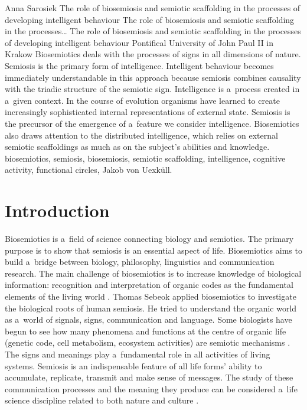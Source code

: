 \begin{artengenv}{Anna Sarosiek}
	{The role of biosemiosis and semiotic scaffolding in the processes of developing intelligent behaviour}
	{The role of biosemiosis and semiotic scaffolding in the processes\ldots}
	{The role of biosemiosis and semiotic scaffolding in the processes\\
	of developing intelligent behaviour}
	{Pontifical University of John Paul II in Krakow\label{sarosiek_anfang}}
	{Biosemiotics deals with the processes of signs in all dimensions of nature. Semiosis is the primary form of intelligence. Intelligent behaviour becomes immediately understandable in this approach because semiosis combines causality with the triadic structure of the semiotic sign. Intelligence is a~process created in a~given context. In the course of evolution organisms have learned to create increasingly sophisticated internal representations of external state. Semiosis is the precursor of the emergence of a~feature we consider intelligence. Biosemiotics also draws attention to the distributed intelligence, which relies on external semiotic scaffoldings as much as on the subject’s abilities and knowledge.}
	{biosemiotics, semiosis, biosemiosis, semiotic scaffolding, intelligence, cognitive activity, functional circles, Jakob von Uexküll.}





\section*{Introduction }
\lettrine[loversize=0.13,lines=2,lraise=-0.03,nindent=0em,findent=0.2pt]%
{B}{}iosemiotics is a~field of science connecting biology and semiotics. The primary purpose is to show that semiosis is an essential aspect of life. Biosemiotics aims to build a~bridge between biology, philosophy, linguistics and communication research. The main challenge of biosemiotics is to increase knowledge of biological information: recognition and interpretation of organic codes as the fundamental elements of the living world
\parencite[][]{barbieri_life_2005}. %
 Thomas Sebeok applied biosemiotics to investigate the biological roots of human semiosis. He tried to understand the organic world as a~world of signals, signs, communication and language. Some biologists have begun to see how many phenomena and functions at the centre of organic life (genetic code, cell metabolism, ecosystem activities) are semiotic mechanisms 
\parencite[][]{anderson_semiotic_1984}. %
 The signs and meanings play a~fundamental role in all activities of living systems. Semiosis is an indispensable feature of all life forms’ ability to accumulate, replicate, transmit and make sense of messages. The study of these communication processes and the meaning they produce can be considered a~life science discipline related to both nature and culture 
\parencite[][p.22]{sebeok_semiotic_1991}.%



\end{artengenv}
